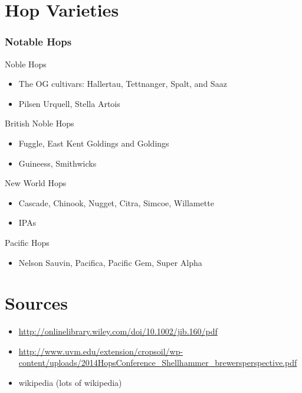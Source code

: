 \documentclass{beamer}
\begin{document}
\section{Hop Varieties}
\begin{frame}\frametitle{Notable Hops}
  Noble Hops
  \begin{itemize}\vspace{-4mm}
  \item The OG cultivars: Hallertau, Tettnanger, Spalt, and Saaz
  \item  Pilsen Urquell,  Stella Artois
  \end{itemize}
  British Noble Hops
  \begin{itemize}\vspace{-4mm}
  \item Fuggle, East Kent Goldings and Goldings
  \item Guineess, Smithwicks
  \end{itemize}
  New World Hops
  \begin{itemize}\vspace{-4mm}
  \item Cascade, Chinook, Nugget, Citra, Simcoe, Willamette
  \item IPAs
  \end{itemize}
  Pacific Hops
  \begin{itemize}\vspace{-4mm}
  \item Nelson Sauvin, Pacifica, Pacific Gem, Super Alpha
  \end{itemize}
\end{frame}

\section{Sources}
\begin{frame}
  \begin{itemize}
  \item \url{http://onlinelibrary.wiley.com/doi/10.1002/jib.160/pdf}
  \item \url{http://www.uvm.edu/extension/cropsoil/wp-content/uploads/2014HopsConference_Shellhammer_brewersperspective.pdf}
  \item wikipedia (lots of wikipedia)
  \end{itemize}
\end{frame}
\end{document}
